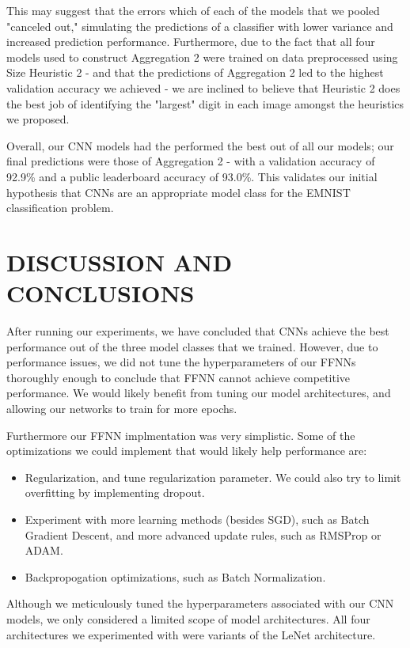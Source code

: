 \documentclass[letterpaper, 10 pt, conference]{ieeeconf}
\begin{document}
This may suggest that the errors which of each of the models that we pooled "canceled out," simulating the predictions of a classifier with lower variance and increased prediction performance. Furthermore, due to the fact that all four models used to construct Aggregation 2 were trained on data preprocessed using Size Heuristic 2 - and that the predictions of Aggregation 2 led to the highest validation accuracy we achieved - we are inclined to believe that Heuristic 2 does the best job of identifying the "largest" digit in each image amongst the heuristics we proposed. 

Overall, our CNN models had the performed the best out of all our models; our final predictions were those of Aggregation 2 - with a validation accuracy of 92.9\% and a public leaderboard accuracy of 93.0\%. This validates our initial hypothesis that CNNs are an appropriate model class for the EMNIST classification problem.

\section{DISCUSSION AND CONCLUSIONS}

After running our experiments, we have concluded that CNNs achieve the best performance out of the three model classes that we trained. However, due to performance issues, we did not tune the hyperparameters of our FFNNs thoroughly enough to conclude that FFNN cannot achieve competitive performance. We would likely benefit from tuning our model architectures, and allowing our networks to train for more epochs. 

Furthermore our FFNN implmentation was very simplistic. Some of the optimizations we could implement that would likely help performance are:

\begin{itemize}
\item Regularization, and tune regularization parameter. We could also try to limit overfitting by implementing dropout.
\item Experiment with more learning methods (besides SGD), such as Batch Gradient Descent, and more advanced update rules, such as RMSProp or ADAM.
\item Backpropogation optimizations, such as Batch Normalization.  
\end{itemize}

Although we meticulously tuned the hyperparameters associated with our CNN models, we only considered a limited scope of model architectures. All four architectures we experimented with were variants of the LeNet architecture. 
\end{document}
